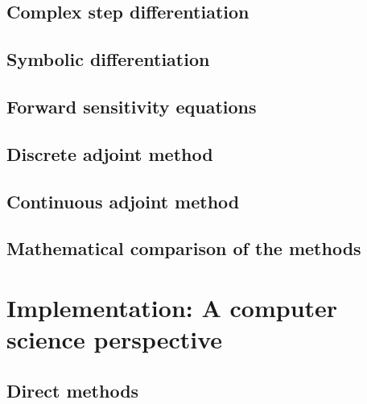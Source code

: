 \documentclass[11pt]{article}
\begin{document}
\subsection{Complex step differentiation}
\label{section:comple-step-differentiation}


\subsection{Symbolic differentiation}
\label{section:symbolic}


\subsection{Forward sensitivity equations}
\label{section:sensitivity-equation}


% 

\subsection{Discrete adjoint method}
\label{section:discrete-adjoint}


\subsection{Continuous adjoint method}
\label{section:continuous-adjoint}


\subsection{Mathematical comparison of the methods}
\label{section:compatison-math}


\section{Implementation: A computer science perspective}
\label{sec:computational-implementation}

\subsection{Direct methods}
\label{section:direct-methods}

\end{document}
